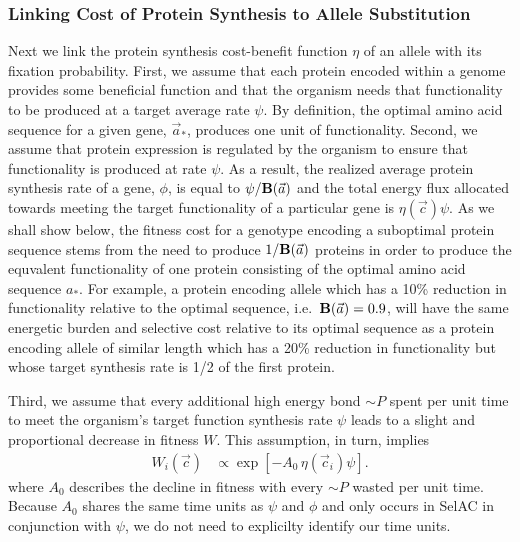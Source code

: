 \documentclass{article}
\newcommand{\Func}{\ensuremath{\text{\textbf{B}}}\xspace}
\newcommand{\simP}{\ensuremath{\sim P}\xspace}
\newcommand{\selac}{SelAC\xspace}
\newcommand{\aopt}{\ensuremath{a_*}\xspace}
\newcommand{\aoptvec}{\ensuremath{\Vec{a}_*}\xspace}
\newcommand{\avec}{\ensuremath{\Vec{a}}\xspace}
\newcommand{\cveci}{\ensuremath{\cvec_i}\xspace}
\newcommand{\cvec}{\ensuremath{\Vec{c}}\xspace}
\begin{document}
\subsubsection*{Linking Cost of Protein Synthesis to Allele Substitution}
Next we link the protein synthesis cost-benefit function $\eta$ of an allele with its fixation probability.
First, we assume that each protein encoded within a genome provides some beneficial function and that the organism needs that functionality to be produced at a target average rate $\psi$.
By definition, the optimal amino acid sequence for a given gene, \aoptvec, produces one unit of functionality.
Second, we assume that protein expression is regulated by the organism to ensure that functionality is produced at rate $\psi$.
As a result, the realized average protein synthesis rate of a gene, $\phi$, is equal to $\psi/\Func(\avec)$ and the total energy flux allocated towards meeting the target functionality of a particular gene is $\eta(\cvec) \psi$.
As we shall show below, the fitness cost for a genotype encoding a suboptimal protein sequence stems from the need to produce $1/\Func(\avec)$ proteins in order to produce the equvalent functionality of one protein consisting of the optimal amino acid sequence \aopt.
For example, a protein encoding allele which has a 10\% reduction in functionality relative to the optimal sequence, i.e.~$\Func(\avec) = 0.9$, will have the same energetic burden and selective cost relative to its optimal sequence as a protein encoding allele of similar length which has a 20\% reduction in functionality but whose target synthesis rate is 1/2 of the first protein.


Third, we assume that every additional high energy bond \simP spent per unit time to meet the organism's target function synthesis rate $\psi$ leads to a slight and proportional decrease in fitness $W$.
This assumption, in turn, implies
\begin{align}
  W_i\left(\cvec\right) &\propto \exp\left[- A_0 \, \eta(\cveci) \psi\right].
\end{align}
where $A_0$ describes the decline in fitness with every \simP wasted per unit time.
Because $A_0$ shares the same time units as $\psi$ and $\phi$ and only occurs in \selac in conjunction with $\psi$, we do not need to explicilty identify our time units.
\end{document}
